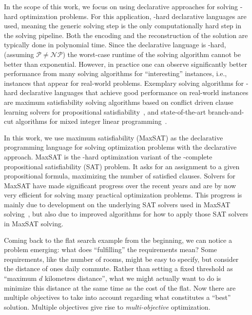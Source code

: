 In the scope of this work, we focus on using declarative approaches for solving \NP-hard optimization problems.
For this application, \NP-hard declarative languages are used, meaning the generic solving step is the only computationally hard step in the solving pipeline.
Both the encoding and the reconstruction of the solution are typically done in polynomial time.
Since the declarative language is \NP-hard, (assuming $\mathcal{P}\neq\mathcal{NP}$) the worst-case runtime of the solving algorithm cannot be better than exponential.
However, in practice one can observe significantly better performance from many solving algorithms for ``interesting'' instances, i.e., instances that appear for real-world problems.
Exemplary solving algorithms for \NP-hard declarative languages that achieve good performance on real-world instances are maximum satisfiability solving algorithms based on conflict driven clause learning solvers for propositional satisfiability~\autocite{handbook2-cdcl}, and state-of-the-art branch-and-cut algorithms for mixed integer linear programming~\autocite{ChenEtAl2010-branch-and-cut}.

In this work, we use maximum satisfiability (MaxSAT) as the declarative programming language for solving optimization problems with the declarative approach.
MaxSAT is the \NP-hard optimization variant of the \NP-complete propositional satisfiability (SAT) problem.
It asks for an assignment to a given propositional formula, maximizing the number of satisfied clauses.
Solvers for MaxSAT have made significant progress over the recent years and are by now very efficient for solving many practical optimization problems.
This progress is mainly due to development on the underlying SAT solvers used in MaxSAT solving~\autocites{DBLP:journals/ai/FroleyksHIJS21,handbook2-cdcl}, but also due to improved algorithms for how to apply those SAT solvers in MaxSAT solving.

Coming back to the flat search example from the beginning, we can notice a problem emerging:
what does ``fulfilling'' the requirements mean?
Some requirements, like the number of rooms, might be easy to specify, but consider the distance of ones daily commute.
Rather than setting a fixed threshold as ``maximum $d$ kilometres distance'', what we might actually want to do is minimize this distance at the same time as the cost of the flat.
Now there are multiple objectives to take into account regarding what constitutes a ``best'' solution.
Multiple objectives give rise to \emph{multi-objective} optimization.

